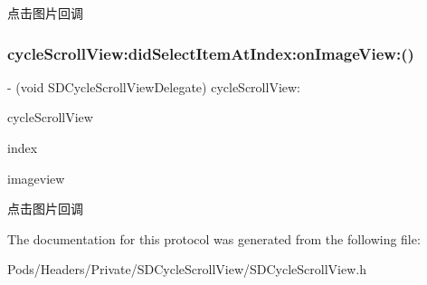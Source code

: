 点击图片回调 \mbox{\label{protocol_s_d_cycle_scroll_view_delegate_01-p_ad67d8b19b0b2353ba188db5f969e4c3e}} 
\subsubsection{\texorpdfstring{cycle\+Scroll\+View\+:did\+Select\+Item\+At\+Index\+:on\+Image\+View\+:()}{cycleScrollView:didSelectItemAtIndex:onImageView:()}\hspace{0.1cm}{\footnotesize\ttfamily [3/3]}}
{\footnotesize\ttfamily -\/ (void S\+D\+Cycle\+Scroll\+View\+Delegate) cycle\+Scroll\+View\+: \begin{DoxyParamCaption}\item[{(\mbox{\hyperlink{interface_s_d_cycle_scroll_view}{S\+D\+Cycle\+Scroll\+View}} $\ast$)}]{cycle\+Scroll\+View }\item[{didSelectItemAtIndex:(N\+S\+Integer)}]{index }\item[{onImageView:(U\+I\+Image\+View $\ast$)}]{imageview }\end{DoxyParamCaption}\hspace{0.3cm}{\ttfamily [optional]}}

点击图片回调 

The documentation for this protocol was generated from the following file\+:\begin{DoxyCompactItemize}
\item 
Pods/\+Headers/\+Private/\+S\+D\+Cycle\+Scroll\+View/S\+D\+Cycle\+Scroll\+View.\+h\end{DoxyCompactItemize}

